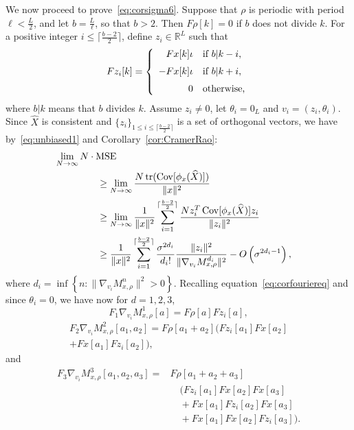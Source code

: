 \documentclass{IEEEtran}
\numberwithin{equation}{section}
\numberwithin{figure}{section}
\theoremstyle{plain}
\theoremstyle{definition}
\theoremstyle{remark}
\theoremstyle{plain}
\theoremstyle{remark}
\theoremstyle{plain}
\theoremstyle{plain}
\theoremstyle{remark}
\newcommand{\RL}{\mathbb{R}^L}
\newcommand{\F}{F}
\DeclareMathOperator*{\tr}{tr}
\DeclareMathOperator*{\Cov}{Cov}
\newcommand{\MSE}{\mathrm{MSE}}
\newcommand{\OO}{{O}}
\begin{document}
We now proceed to prove~\eqref{eq:corsigma6}. Suppose that $\rho$ is periodic with period $\ell<\frac L 2$, and let $b=\frac L \ell$, so that $b>2$. Then $\F \rho[k]= 0$ if $b$ does not divide $k$. For a positive integer $i\le \lceil\frac{b-2}2\rceil$, define $z_i\in \RL$ such that 
$$\F z_i[k]=\left\{\begin{array}{rl}
\medskip  \F x[k]\iota&\text{if }b|k-i,\\
\medskip -\F x[k]\iota&\text{if }b|k+i,\\
0&\text{otherwise,}\end{array}\right.$$
where $b|k$ means that $b$ divides $k$.
Assume $z_i\neq 0$, let $\theta_i=0_L$ and $v_i=(z_i,\theta_i)$. Since $\widehat X$ is consistent and $\{z_i\}_{1\le i\le \lceil\frac{b-2}2\rceil}$ is a set of orthogonal vectors, we have by~\eqref{eq:unbiased1} and Corollary~\ref{cor:CramerRao}:
\begin{align*}
\lim_{N\rightarrow \infty}N\cdot \MSE \hspace{-20pt}\\
&\ge\lim_{N\rightarrow \infty}\frac{N\tr(\Cov[\phi_x(\widehat X)])}{\|x\|^2}\\
&\ge \lim_{N\rightarrow \infty}\frac1{\|x\|^2} \sum_{i=1}^{\lceil\frac{b-2}2\rceil} \frac{N z_i^T \Cov[\phi_x(\widehat X)]z_i}{\|z_i\|^2} \\
&\ge \frac{1}{\|x\|^2}\sum_{i=1}^{\lceil\frac{b-2}2\rceil}  \frac{\sigma^{2d_i}}{d_i!}\frac{\|z_i\|^2}{\|\nabla_{v_i} M^{d_i}_{x,\rho} \|^2} - \OO\left(\sigma^{2d_i-1}\right),
\end{align*}
where $d_i=\inf\left\{n:\|\nabla_{v_i} M^n_{x,\rho} \|^2>0\right\}$. Recalling equation~\eqref{eq:corfouriereq} and since $\theta_i=0$, we have now for $d=1,2,3$,
\begin{equation}\label{eq:cor6acorr1}
\F_1\nabla_{v_i} M^1_{x,\rho}[a]=\F\rho[a]\F z_i[a],
\end{equation}
\begin{multline}\label{eq:cor6acorr2}
\F_2\nabla_{v_i} M^2_{x,\rho}[a_1,a_2]=\F \rho\left[a_1+a_2\right](\F z_i[a_1]\F x[a_2]\\
+\F x[a_1]\F z_i[a_2]),
\end{multline}
and
\begin{align}
\nonumber \F_3\nabla_{v_i} M^3_{x,\rho}[a_1,a_2,a_3]=&\F \rho\left[a_1+a_2+a_3\right]\\
\nonumber &\quad (\F z_i[a_1]\F x[a_2]\F x[a_3]\\
\nonumber &\quad +\F x[a_1]\F z_i[a_2]\F x[a_3]\\
&\quad +\F x[a_1]\F x[a_2]\F z_i[a_3]). \label{eq:cor6acorr3}
\end{align}
\end{document}
